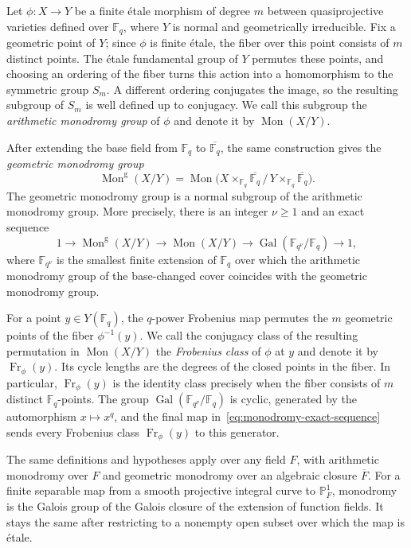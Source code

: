 \documentclass[10pt,a4paper]{amsart}
\theoremstyle{definition}
\theoremstyle{remark}
\newcommand{\bF}{\mathbb{F}}
\newcommand{\Fq}{\mathbb{F}_q}
\newcommand{\bP}{\mathbb{P}}
\begin{document}
Let $\phi\colon X\to Y$ be a finite \'etale morphism of degree $m$ between quasiprojective varieties defined over $\Fq$, where $Y$ is normal and geometrically irreducible. Fix a geometric point of $Y$; since $\phi$ is finite \'etale, the fiber over this point consists of $m$ distinct points. The \'etale fundamental group of $Y$ permutes these points, and choosing an ordering of the fiber turns this action into a homomorphism to the symmetric group $S_m$. A different ordering conjugates the image, so the resulting subgroup of $S_m$ is well defined up to conjugacy. We call this subgroup the \emph{arithmetic monodromy group} of $\phi$ and denote it by $\operatorname{Mon}(X/Y)$.

After extending the base field from $\Fq$ to $\overline{\Fq}$, the same construction gives the \emph{geometric monodromy group}
\[
\operatorname{Mon}^{\mathrm{g}}(X/Y)
=
\operatorname{Mon}\bigl(X\times_{\Fq}\overline{\Fq}\,/\,Y\times_{\Fq}\overline{\Fq}\bigr).
\]
The geometric monodromy group is a normal subgroup of the arithmetic monodromy group. More precisely, there is an integer $\nu\geq 1$ and an exact sequence
\begin{equation}\label{eq:monodromy-exact-sequence}
1\longrightarrow \operatorname{Mon}^{\mathrm{g}}(X/Y)
\longrightarrow \operatorname{Mon}(X/Y)
\longrightarrow \operatorname{Gal}(\bF_{q^\nu}/\Fq)
\longrightarrow 1,
\end{equation}
where $\bF_{q^\nu}$ is the smallest finite extension of $\Fq$ over which the arithmetic monodromy group of the base-changed cover coincides with the geometric monodromy group.

For a point $y\in Y(\Fq)$, the $q$-power Frobenius map permutes the $m$ geometric points of the fiber $\phi^{-1}(y)$. We call the conjugacy class of the resulting permutation in $\operatorname{Mon}(X/Y)$ the \emph{Frobenius class} of $\phi$ at $y$ and denote it by $\operatorname{Fr}_{\phi}(y)$. Its cycle lengths are the degrees of the closed points in the fiber. In particular, $\operatorname{Fr}_{\phi}(y)$ is the identity class precisely when the fiber consists of $m$ distinct $\Fq$-points. The group $\operatorname{Gal}(\bF_{q^\nu}/\Fq)$ is cyclic, generated by the automorphism $x\mapsto x^q$, and the final map in~\eqref{eq:monodromy-exact-sequence} sends every Frobenius class $\operatorname{Fr}_{\phi}(y)$ to this generator. 

The same definitions and hypotheses apply over any field $F$, with arithmetic monodromy over $F$ and geometric monodromy over an algebraic closure $\overline F$. For a finite separable map from a smooth projective integral curve to $\bP^1_F$, monodromy is the Galois group of the Galois closure of the extension of function fields. It stays the same after restricting to a nonempty open subset over which the map is \'etale.
\end{document}
